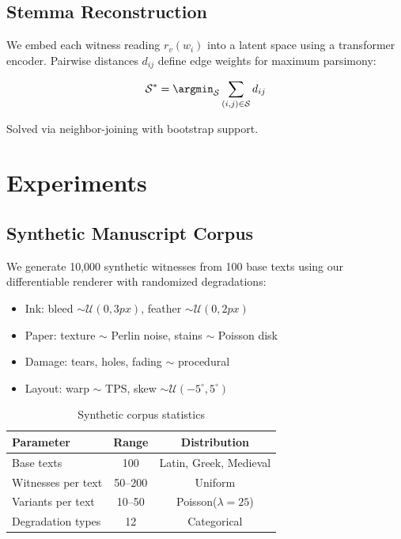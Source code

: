 \documentclass[12pt,a4paper]{article}
\begin{document}
\subsection{Stemma Reconstruction}
\label{sec:stemma-rec}

We embed each witness reading $r_v(w_i)$ into a latent space
using a transformer encoder. Pairwise distances $d_{ij}$ define
edge weights for maximum parsimony:

\begin{equation}\label{eq:parsimony}
\mathcal{S}^* = \argmin_{\mathcal{S}} \sum_{(i,j) \in \mathcal{S}} d_{ij}
\end{equation}

Solved via neighbor-joining with bootstrap support.

\section{Experiments}
\label{sec:experiments}

\subsection{Synthetic Manuscript Corpus}
\label{sec:synthetic}

We generate 10,000 synthetic witnesses from 100 base texts
using our differentiable renderer with randomized degradations:
\begin{itemize}
    \item Ink: bleed $\sim \mathcal{U}(0, 3px)$, feather $\sim \mathcal{U}(0, 2px)$
    \item Paper: texture $\sim$ Perlin noise, stains $\sim$ Poisson disk
    \item Damage: tears, holes, fading $\sim$ procedural
    \item Layout: warp $\sim$ TPS, skew $\sim \mathcal{U}(-5^\circ, 5^\circ)$
\end{itemize}

\begin{table}[htbp]
\caption{Synthetic corpus statistics}\label{tab:synthetic}
\begin{tabular}{lcc}
\toprule
Parameter & Range & Distribution \\
\midrule
Base texts & 100 & Latin, Greek, Medieval \\
Witnesses per text & 50--200 & Uniform \\
Variants per text & 10--50 & Poisson($\lambda=25$) \\
Degradation types & 12 & Categorical \\
\bottomrule
\end{tabular}
\end{table}
\end{document}

